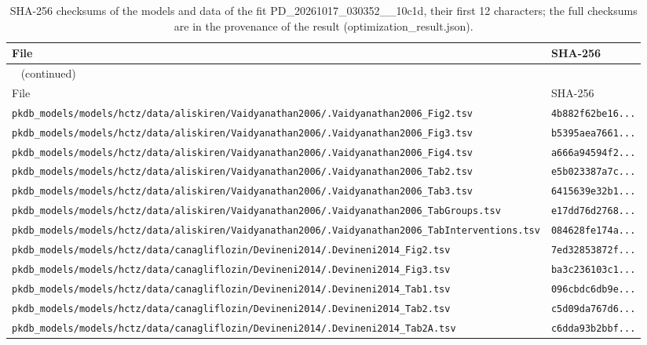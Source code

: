 \documentclass{article}
\begin{document}
\begin{longtable}{ll}
\caption{SHA-256 checksums of the models and data of the fit PD\_20261017\_030352\_\_10c1d, their first 12 characters; the full checksums are in the provenance of the result (optimization\_result.json).}\label{tab:checksums:PD_20261017_030352__10c1d} \\
\toprule
File & SHA-256 \\
\midrule
\endfirsthead
\multicolumn{2}{l}{\small\tablename~\thetable{} (continued)} \\
\toprule
File & SHA-256 \\
\midrule
\endhead
\bottomrule
\endlastfoot
\texttt{pkdb\_models/models/hctz/data/aliskiren/Vaidyanathan2006/.Vaidyanathan2006\_Fig2.tsv} & \texttt{4b882f62be16...} \\
\texttt{pkdb\_models/models/hctz/data/aliskiren/Vaidyanathan2006/.Vaidyanathan2006\_Fig3.tsv} & \texttt{b5395aea7661...} \\
\texttt{pkdb\_models/models/hctz/data/aliskiren/Vaidyanathan2006/.Vaidyanathan2006\_Fig4.tsv} & \texttt{a666a94594f2...} \\
\texttt{pkdb\_models/models/hctz/data/aliskiren/Vaidyanathan2006/.Vaidyanathan2006\_Tab2.tsv} & \texttt{e5b023387a7c...} \\
\texttt{pkdb\_models/models/hctz/data/aliskiren/Vaidyanathan2006/.Vaidyanathan2006\_Tab3.tsv} & \texttt{6415639e32b1...} \\
\texttt{pkdb\_models/models/hctz/data/aliskiren/Vaidyanathan2006/.Vaidyanathan2006\_TabGroups.tsv} & \texttt{e17dd76d2768...} \\
\texttt{pkdb\_models/models/hctz/data/aliskiren/Vaidyanathan2006/.Vaidyanathan2006\_TabInterventions.tsv} & \texttt{084628fe174a...} \\
\texttt{pkdb\_models/models/hctz/data/canagliflozin/Devineni2014/.Devineni2014\_Fig2.tsv} & \texttt{7ed32853872f...} \\
\texttt{pkdb\_models/models/hctz/data/canagliflozin/Devineni2014/.Devineni2014\_Fig3.tsv} & \texttt{ba3c236103c1...} \\
\texttt{pkdb\_models/models/hctz/data/canagliflozin/Devineni2014/.Devineni2014\_Tab1.tsv} & \texttt{096cbdc6db9e...} \\
\texttt{pkdb\_models/models/hctz/data/canagliflozin/Devineni2014/.Devineni2014\_Tab2.tsv} & \texttt{c5d09da767d6...} \\
\texttt{pkdb\_models/models/hctz/data/canagliflozin/Devineni2014/.Devineni2014\_Tab2A.tsv} & \texttt{c6dda93b2bbf...} \\

\end{longtable}
\end{document}

